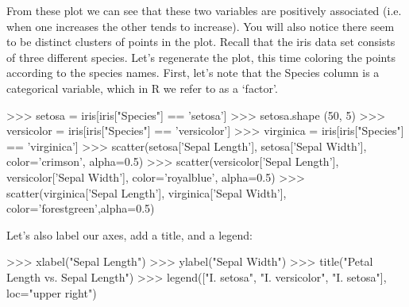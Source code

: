 From these plot we can see that these two variables are positively associated (i.e. when one increases the other tends to increase). You will also notice there seem to be distinct clusters of points in the plot. Recall that the iris data set consists of three different species.  Let's regenerate the plot, this time coloring the points according to the species names.
%
First, let's note that the Species column is a categorical variable, which in R we refer to as a `factor'.
%
\begin{python}
>>> setosa = iris[iris["Species"] == 'setosa']
>>> setosa.shape
(50, 5)
>>> versicolor = iris[iris["Species"] == 'versicolor']
>>> virginica = iris[iris["Species"] == 'virginica']
>>> scatter(setosa['Sepal Length'], setosa['Sepal Width'], color='crimson', alpha=0.5)
>>> scatter(versicolor['Sepal Length'], versicolor['Sepal Width'], color='royalblue', alpha=0.5)
>>> scatter(virginica['Sepal Length'], virginica['Sepal Width'], color='forestgreen',alpha=0.5)
\end{python}
%
Let's also label our axes, add a title, and a legend:
%
\begin{python}
>>> xlabel("Sepal Length")
>>> ylabel("Sepal Width")
>>> title("Petal Length vs. Sepal Length")
>>> legend(["I. setosa", "I. versicolor", "I. setosa"], loc="upper right")
\end{python}



